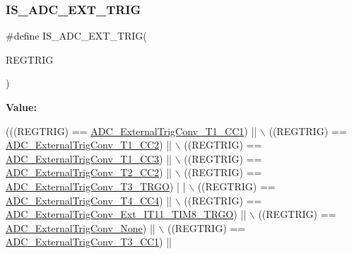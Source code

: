 \subsubsection{\texorpdfstring{I\+S\+\_\+\+A\+D\+C\+\_\+\+E\+X\+T\+\_\+\+T\+R\+IG}{IS\_ADC\_EXT\_TRIG}}
{\footnotesize\ttfamily \#define I\+S\+\_\+\+A\+D\+C\+\_\+\+E\+X\+T\+\_\+\+T\+R\+IG(\begin{DoxyParamCaption}\item[{}]{R\+E\+G\+T\+R\+IG }\end{DoxyParamCaption})}

{\bfseries Value\+:}
\begin{DoxyCode}
(((REGTRIG) == \hyperlink{group___a_d_c__external__trigger__sources__for__regular__channels__conversion_ga303f24361ea930f8214e9e68b63b244e}{ADC\_ExternalTrigConv\_T1\_CC1}) || \(\backslash\)
                                  ((REGTRIG) == \hyperlink{group___a_d_c__external__trigger__sources__for__regular__channels__conversion_ga8bf9fd9ad4e4c12ef41520ded2c3c332}{ADC\_ExternalTrigConv\_T1\_CC2}) || 
      \(\backslash\)
                                  ((REGTRIG) == \hyperlink{group___a_d_c__external__trigger__sources__for__regular__channels__conversion_ga41ad03e2921f6de0fb75ae06d6046e63}{ADC\_ExternalTrigConv\_T1\_CC3}) || 
      \(\backslash\)
                                  ((REGTRIG) == \hyperlink{group___a_d_c__external__trigger__sources__for__regular__channels__conversion_gadfeb40c1735b0ee50f8a5aafdd840cc6}{ADC\_ExternalTrigConv\_T2\_CC2}) || 
      \(\backslash\)
                                  ((REGTRIG) == \hyperlink{group___a_d_c__external__trigger__sources__for__regular__channels__conversion_ga1cf4549534a00fe2f5527ad783204098}{ADC\_ExternalTrigConv\_T3\_TRGO}) |
      | \(\backslash\)
                                  ((REGTRIG) == \hyperlink{group___a_d_c__external__trigger__sources__for__regular__channels__conversion_ga8f6a764b7de878c2e09bbb0d1061d69c}{ADC\_ExternalTrigConv\_T4\_CC4}) || 
      \(\backslash\)
                                  ((REGTRIG) == 
      \hyperlink{group___a_d_c__external__trigger__sources__for__regular__channels__conversion_ga640de59aeac8cc3d96b6db3497975d02}{ADC\_ExternalTrigConv\_Ext\_IT11\_TIM8\_TRGO}) || \(\backslash\)
                                  ((REGTRIG) == \hyperlink{group___a_d_c__external__trigger__sources__for__regular__channels__conversion_ga433a3845ed1792fa6359b763c955e9c2}{ADC\_ExternalTrigConv\_None}) || \(\backslash\)
                                  ((REGTRIG) == \hyperlink{group___a_d_c__external__trigger__sources__for__regular__channels__conversion_ga3c73d5c8bb0f898dbbc74bcc536f6ec1}{ADC\_ExternalTrigConv\_T3\_CC1}) || 

\end{DoxyCode}
